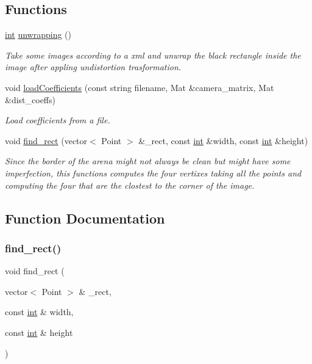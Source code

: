 \subsection*{Functions}
\begin{DoxyCompactItemize}
\item 
\mbox{\hyperlink{draw_8hh_aa620a13339ac3a1177c86edc549fda9b}{int}} \mbox{\hyperlink{unwrapping_8hh_ae232c3264987d57a223a39226929da29}{unwrapping}} ()
\begin{DoxyCompactList}\small\item\em Take some images according to a xml and unwrap the black rectangle inside the image after appling undistortion trasformation. \end{DoxyCompactList}\item 
void \mbox{\hyperlink{unwrapping_8hh_a3cf7df08897ed4d1a7ddcf055b18cca8}{load\+Coefficients}} (const string filename, Mat \&camera\+\_\+matrix, Mat \&dist\+\_\+coeffs)
\begin{DoxyCompactList}\small\item\em Load coefficients from a file. \end{DoxyCompactList}\item 
void \mbox{\hyperlink{unwrapping_8hh_ac30b4dbae9022e84e10ef97ba156c581}{find\+\_\+rect}} (vector$<$ Point $>$ \&\+\_\+rect, const \mbox{\hyperlink{draw_8hh_aa620a13339ac3a1177c86edc549fda9b}{int}} \&width, const \mbox{\hyperlink{draw_8hh_aa620a13339ac3a1177c86edc549fda9b}{int}} \&height)
\begin{DoxyCompactList}\small\item\em Since the border of the arena might not always be clean but might have some imperfection, this functions computes the four vertixes taking all the points and computing the four that are the clostest to the corner of the image. \end{DoxyCompactList}\end{DoxyCompactItemize}


\subsection{Function Documentation}
\mbox{\label{unwrapping_8hh_ac30b4dbae9022e84e10ef97ba156c581}} 
\subsubsection{\texorpdfstring{find\_rect()}{find\_rect()}}
{\footnotesize\ttfamily void find\+\_\+rect (\begin{DoxyParamCaption}\item[{vector$<$ Point $>$ \&}]{\+\_\+rect,  }\item[{const \mbox{\hyperlink{draw_8hh_aa620a13339ac3a1177c86edc549fda9b}{int}} \&}]{width,  }\item[{const \mbox{\hyperlink{draw_8hh_aa620a13339ac3a1177c86edc549fda9b}{int}} \&}]{height }\end{DoxyParamCaption})}



